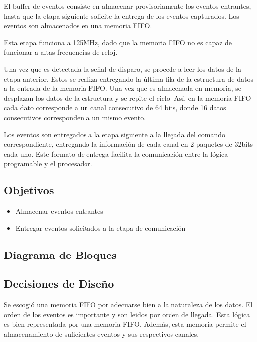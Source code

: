 El buffer de eventos consiste en almacenar provisoriamente los eventos entrantes, hasta que la etapa siguiente solicite la entrega de los eventos capturados. Los eventos son almacenados en una memoria FIFO.

Esta etapa funciona a 125MHz, dado que la memoria FIFO no es capaz de funcionar a altas frecuencias de reloj.

Una vez que es detectada la señal de disparo, se procede a leer los datos de la etapa anterior. Estos se realiza entregando la última fila de la estructura de datos a la entrada de la memoria FIFO. Una vez que es almacenada en memoria, se desplazan los datos de la estructura y se repite el ciclo. Así, en la memoria FIFO cada dato corresponde a un canal consecutivo de 64 bits, donde 16 datos consecutivos corresponden a un mismo evento.

Los eventos son entregados a la etapa siguiente a la llegada del comando correspondiente, entregando la información de cada canal en 2 paquetes de 32bits cada uno. Este formato de entrega facilita la comunicación entre la lógica programable y el procesador.

\subsection{Objetivos}
\begin{itemize}
	\item Almacenar eventos entrantes
	\item Entregar eventos solicitados a la etapa de comunicación
\end{itemize}

\subsection{Diagrama de Bloques}


\subsection{Decisiones de Diseño}

Se escogió una memoria FIFO por adecuarse bien a la naturaleza de los datos. El orden de los eventos es importante y son leidos por orden de llegada. Esta lógica es bien representada por una memoria FIFO. Además, esta memoria permite el almacenamiento de suficientes eventos y sus respectivos canales. %

